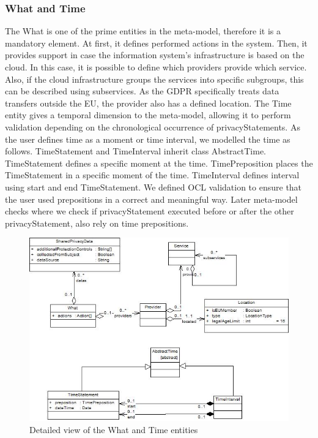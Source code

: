 \documentclass[11pt,english]{article}
\begin{document}
\subsubsection{What and Time}
The What is one of the prime entities in the meta-model, therefore it is a mandatory element. At first, it defines performed actions in the system. Then, it provides support in case the information system's infrastructure is based on the cloud. In this case, it is possible to define which providers provide which service. Also, if the cloud infrastructure groups the services into specific subgroups, this can be described using subservices. As the GDPR specifically treats data transfers outside the EU, the provider also has a defined location. \newline The Time entity gives a temporal dimension to the meta-model, allowing it to perform validation depending on the chronological occurrence of privacyStatements. As the user defines time as a moment or time interval, we modelled the time as follows. TimeStatement and TimeInterval inherit class AbstractTime. TimeStatement defines a specific moment at the time. TimePreposition places the TimeStatement in a specific moment of the time. TimeInterval defines interval using start and end TimeStatement. We defined OCL validation to ensure that the user used prepositions in a correct and meaningful way. Later meta-model checks where we check if privacyStatement executed before or after the other privacyStatement, also rely on time prepositions.
\begin{figure}[H]
    \centering
    \includegraphics[width=12.5cm]{images/whatAndTime.jpg}
    \caption{Detailed view of the What and Time entities}
    \label{fig:WhatAndTime}
\end{figure}
\end{document}
